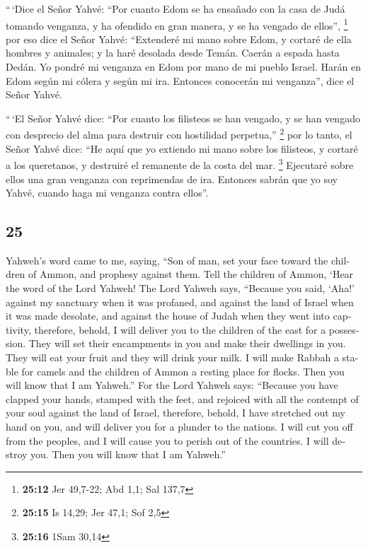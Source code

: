 \begin{paracol}{2}
 ``\,`Dice el Señor Yahvé: ``Por cuanto Edom se ha
ensañado con la casa de Judá tomando venganza, y ha ofendido en gran
manera, y se ha vengado de ellos'', \footnote{\textbf{25:12} Jer
  49,7-22; Abd 1,1; Sal 137,7}  por eso dice el Señor
Yahvé: ``Extenderé mi mano sobre Edom, y cortaré de ella hombres y
animales; y la haré desolada desde Temán. Caerán a espada hasta Dedán.
 Yo pondré mi venganza en Edom por mano de mi pueblo
Israel. Harán en Edom según mi cólera y según mi ira. Entonces conocerán
mi venganza'', dice el Señor Yahvé.

 ``\,`El Señor Yahvé dice: ``Por cuanto los filisteos se
han vengado, y se han vengado con desprecio del alma para destruir con
hostilidad perpetua,'' \footnote{\textbf{25:15} Is 14,29; Jer 47,1; Sof
  2,5}  por lo tanto, el Señor Yahvé dice: ``He aquí que
yo extiendo mi mano sobre los filisteos, y cortaré a los queretanos, y
destruiré el remanente de la costa del mar. \footnote{\textbf{25:16}
  1Sam 30,14}  Ejecutaré sobre ellos una gran venganza
con reprimendas de ira. Entonces sabrán que yo soy Yahvé, cuando haga mi
venganza contra ellos''.

\switchcolumn
\begin{otherlanguage}{english}

\hypertarget{section-49}{%
\section{25}\label{section-49}}

 Yahweh's word came to me, saying,  ``Son of
man, set your face toward the children of Ammon, and prophesy against
them.  Tell the children of Ammon, `Hear the word of the
Lord Yahweh! The Lord Yahweh says, ``Because you said, `Aha!' against my
sanctuary when it was profaned, and against the land of Israel when it
was made desolate, and against the house of Judah when they went into
captivity,  therefore, behold, I will deliver you to the
children of the east for a possession. They will set their encampments
in you and make their dwellings in you. They will eat your fruit and
they will drink your milk.  I will make Rabbah a stable
for camels and the children of Ammon a resting place for flocks. Then
you will know that I am Yahweh.''  For the Lord Yahweh
says: ``Because you have clapped your hands, stamped with the feet, and
rejoiced with all the contempt of your soul against the land of Israel,
 therefore, behold, I have stretched out my hand on you,
and will deliver you for a plunder to the nations. I will cut you off
from the peoples, and I will cause you to perish out of the countries. I
will destroy you. Then you will know that I am Yahweh.''


\end{otherlanguage}
\end{paracol}
